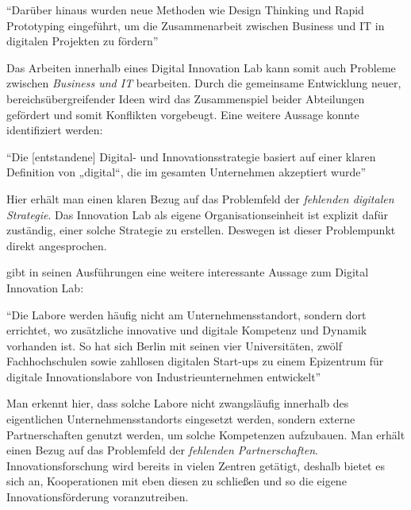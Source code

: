 \begin{center}
	``Darüber hinaus wurden neue Methoden wie Design Thinking und Rapid Prototyping eingeführt, um die Zusammenarbeit zwischen Business und IT in digitalen Projekten zu fördern'' \cite[S. 261]{urbach_digitalization_2018}
\end{center}

Das Arbeiten innerhalb eines Digital Innovation Lab kann somit auch Probleme zwischen \textit{Business und IT} bearbeiten. Durch die gemeinsame Entwicklung neuer, bereichsübergreifender Ideen wird das Zusammenspiel beider Abteilungen gefördert und somit Konflikten vorgebeugt. Eine weitere Aussage konnte identifiziert werden:

\begin{center}
	``Die [entstandene] Digital- und Innovationsstrategie basiert auf einer klaren Definition von „digital“, die im gesamten Unternehmen akzeptiert wurde'' \cite[S. 259]{urbach_digitalization_2018}
\end{center}

Hier erhält man einen klaren Bezug auf das Problemfeld der \textit{fehlenden digitalen Strategie}. Das Innovation Lab als eigene Organisationseinheit ist explizit dafür zuständig, einer solche Strategie zu erstellen. Deswegen ist dieser Problempunkt direkt angesprochen.

 gibt in seinen Ausführungen eine weitere interessante Aussage zum Digital Innovation Lab:

\begin{center}
	``Die Labore werden häufig nicht am Unternehmensstandort, sondern dort errichtet, wo zusätzliche innovative und digitale Kompetenz und Dynamik vorhanden ist. So hat sich Berlin mit seinen vier Universitäten, zwölf Fachhochschulen sowie zahllosen digitalen Start-ups zu einem Epizentrum für digitale Innovationslabore von Industrieunternehmen entwickelt'' \cite[S. 183]{weinreich_lean_2016}
\end{center}

Man erkennt hier, dass solche Labore nicht zwangsläufig innerhalb des eigentlichen Unternehmensstandorts eingesetzt werden, sondern externe Partnerschaften genutzt werden, um solche Kompetenzen aufzubauen. Man erhält einen Bezug auf das Problemfeld der \textit{fehlenden Partnerschaften}. Innovationsforschung wird bereits in vielen Zentren getätigt, deshalb bietet es sich an, Kooperationen mit eben diesen zu schließen und so die eigene Innovationsförderung voranzutreiben.

